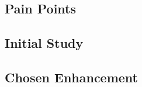 \subsection{Pain Points}
\label{sec:pain-points}

\subsection{Initial Study}
\label{sec:initial-study}

\subsection{Chosen Enhancement}
\label{sec:chosen-enhancement}

